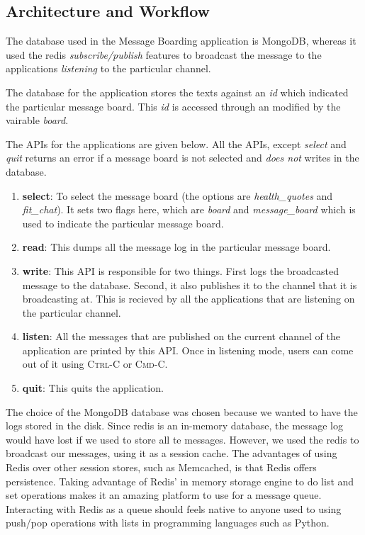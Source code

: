 \documentclass[letterpaper]{article}
\begin{document}
\subsection{Architecture and Workflow}

The database used in the Message Boarding application is MongoDB, whereas it used the redis \textit{subscribe/publish} features to broadcast the message to the applications \textit{listening} to the particular channel. 

The database for the application stores the texts against an \textit{id} which indicated the particular message board. This \textit{id} is accessed through an modified by the vairable \textit{board}.

The APIs for the applications are given below. All the APIs, except \textit{select} and \textit{quit} returns an error if a message board is not selected and \textit{does not} writes in the database. 

\begin{enumerate}
	\item \textbf{select}: To select the message board (the options are \textit{health\_quotes} and \textit{fit\_chat}). It sets two flags here, which are \textit{board} and \textit{message\_board} which is used to indicate the particular  message board. 
	\item \textbf{read}: This dumps all the message log in the particular message board.
	\item \textbf{write}: This API is responsible for two things. First logs the broadcasted message to the database. Second, it also publishes it to the channel that it is broadcasting at. This is recieved by all the applications that are listening on the particular channel. 
	\item \textbf{listen}: All the messages that are published on the current channel of the application are printed by this API. Once in listening mode, users can come out of it using \textsc{Ctrl-C} or \textsc{Cmd-C}.
	\item \textbf{quit}: This quits the application. 
\end{enumerate}

The choice of the MongoDB database was chosen because we wanted to have the logs stored in the disk. Since redis is an in-memory database, the message log would have lost if we used to store all te messages. However, we used the redis to broadcast our messages, using it as a session cache. The advantages of using Redis over other session stores, such as Memcached, is that Redis offers persistence. Taking advantage of Redis' in memory storage engine to do list and set operations makes it an amazing platform to use for a message queue. Interacting with Redis as a queue should feels native to anyone used to using push/pop operations with lists in programming languages such as Python.
\end{document}
